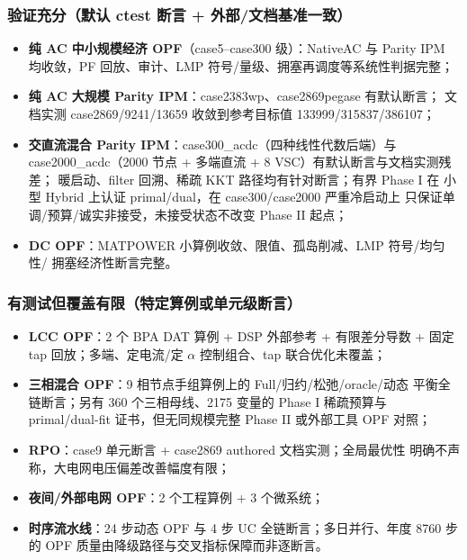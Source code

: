 \subsubsection*{验证充分（默认 ctest 断言 + 外部/文档基准一致）}
\begin{itemize}
  \item \textbf{纯 AC 中小规模经济 OPF}（case5--case300 级）：NativeAC 与 Parity IPM
        均收敛，PF 回放、审计、LMP 符号/量级、拥塞再调度等系统性判据完整；
  \item \textbf{纯 AC 大规模 Parity IPM}：case2383wp、case2869pegase 有默认断言；
        文档实测 case2869/9241/13659 收敛到参考目标值 133999/315837/386107；
  \item \textbf{交直流混合 Parity IPM}：case300\_acdc（四种线性代数后端）与
        case2000\_acdc（2000 节点 + 多端直流 + 8 VSC）有默认断言与文档实测残差；
        暖启动、filter 回溯、稀疏 KKT 路径均有针对断言；有界 Phase I 在
        小型 Hybrid 上认证 primal/dual，在 case300/case2000 严重冷启动上
        只保证单调/预算/诚实非接受，未接受状态不改变 Phase II 起点；
  \item \textbf{DC OPF}：MATPOWER 小算例收敛、限值、孤岛削减、LMP 符号/均匀性/
        拥塞经济性断言完整。
\end{itemize}

\subsubsection*{有测试但覆盖有限（特定算例或单元级断言）}
\begin{itemize}
  \item \textbf{LCC OPF}：2 个 BPA DAT 算例 + DSP 外部参考 + 有限差分导数 + 固定
        tap 回放；多端、定电流/定 $\alpha$ 控制组合、tap 联合优化未覆盖；
  \item \textbf{三相混合 OPF}：9 相节点手组算例上的 Full/归约/松弛/oracle/动态
        平衡全链断言；另有 360 个三相母线、2175 变量的 Phase I 稀疏预算与
        primal/dual-fit 证书，但无同规模完整 Phase II 或外部工具 OPF 对照；
  \item \textbf{RPO}：case9 单元断言 + case2869 authored 文档实测；全局最优性
        明确不声称，大电网电压偏差改善幅度有限；
  \item \textbf{夜间/外部电网 OPF}：2 个工程算例 + 3 个微系统；
  \item \textbf{时序流水线}：24 步动态 OPF 与 4 步 UC 全链断言；多日并行、年度
        8760 步的 OPF 质量由降级路径与交叉指标保障而非逐断言。
\end{itemize}

